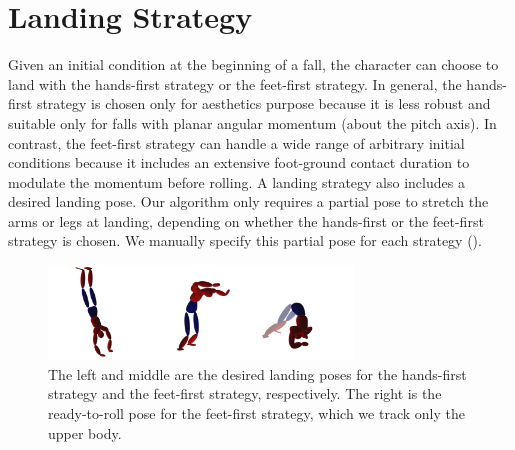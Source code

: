 \section{Landing Strategy}

Given an initial condition at the beginning of a fall, the character
can choose to land with the hands-first strategy or the feet-first
strategy.  In general, the hands-first strategy is chosen only for
aesthetics purpose because it is less robust and suitable only for
falls with planar angular momentum (about the pitch axis). In
contrast, the feet-first strategy can handle a wide range of arbitrary
initial conditions because it includes an extensive foot-ground
contact duration to modulate the momentum before rolling. A
landing strategy also includes a desired landing pose. Our algorithm
only requires a partial pose to stretch the arms or legs at landing,
depending on whether the hands-first or the feet-first strategy is
chosen. We manually specify this partial pose for each strategy
().


\begin{figure}[ht]
\center
  \includegraphics[width=3.2in]{images/LandingPoses}
  \caption{
    The left and middle are the desired landing poses for the
    hands-first strategy and the feet-first strategy, respectively.
    The right is the ready-to-roll pose for the feet-first strategy,
    which we track only the upper body.
  }
 \label{fig:landing_landingPoses}
\end{figure}

